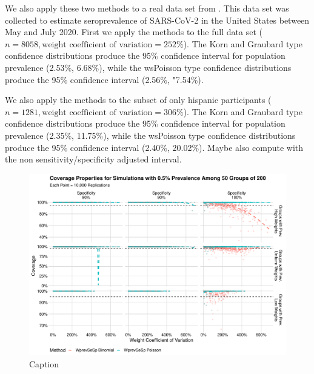 \documentclass[AMA,STIX1COL]{WileyNJD-v2}
\begin{document}
We also apply these two methods to a real data set from \cite{Kali:2021}.
This data set was collected to estimate seroprevalence of SARS-CoV-2 in the United States between May and July 2020.
First we apply the methods to the full data set (\( n =  8058, \text{weight coefficient of variation} = 252\%\)).
The Korn and Graubard type confidence distributions produce the 95\% confidence interval for population prevalence (2.53\%, 6.68\%), while the wsPoisson type confidence distributions produce the 95\% confidence interval (2.56\%, "7.54\%).

We also apply the methods to the subset of only hispanic participants (\( n = 1281, \text{weight coefficient of variation} = 306\% \)).
The Korn and Graubard type confidence distributions produce the 95\% confidence interval for population prevalence (2.35\%, 11.75\%), while the wsPoisson type confidence distributions produce the 95\% confidence interval (2.40\%, 20.02\%).
\todo[inline] Maybe also compute with the non sensitivity/specificity adjusted interval.

\begin{figure}
    \centering
    \includegraphics[width=\textwidth]{figures/imperfect_coverage_50_0_005_reduced.pdf}
    \caption{Caption}
    \label{fig:imperfect_coverage_50_0_005_reduced}
\end{figure}
\end{document}
